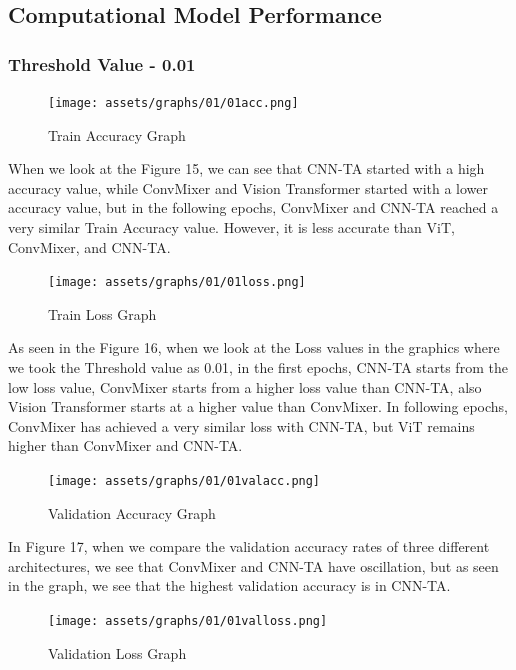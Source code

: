 \documentclass[]{article}
\begin{document}
\subsection{Computational Model Performance}
\subsubsection{Threshold Value - 0.01}
\begin{figure}[H]
    \begin{center}
        \texttt{[image: assets/graphs/01/01acc.png]}
        \caption{Train Accuracy Graph}
    \end{center}
\end{figure}
When we look at the Figure 15, we can see that CNN-TA started with a high accuracy value, while ConvMixer and Vision Transformer started with a lower accuracy value, but in the following epochs, ConvMixer and CNN-TA reached a very similar Train Accuracy value. However, it is less accurate than ViT, ConvMixer, and CNN-TA.
\begin{figure}[H]
    \begin{center}
        \texttt{[image: assets/graphs/01/01loss.png]}
        \caption{Train Loss Graph}
    \end{center}
\end{figure}
\noindent
As seen in the Figure 16, when we look at the Loss values in the graphics where we took the Threshold value as 0.01, in the first epochs, CNN-TA starts from the low loss value, ConvMixer starts from a higher loss value than CNN-TA, also Vision Transformer starts at a higher value than ConvMixer. In following epochs, ConvMixer has achieved a very similar loss with CNN-TA, but ViT remains higher than ConvMixer and CNN-TA. \vspace{0.1cm}
\begin{figure}[H]
    \begin{center}
        \texttt{[image: assets/graphs/01/01valacc.png]}
        \caption{Validation Accuracy Graph}
    \end{center}
\end{figure}
\noindent
In Figure 17, when we compare the validation accuracy rates of three different architectures, we see that ConvMixer and CNN-TA have oscillation, but as seen in the graph, we see that the highest validation accuracy is in CNN-TA.
\begin{figure}[H]
    \begin{center}
        \texttt{[image: assets/graphs/01/01valloss.png]}
        \caption{Validation Loss Graph}
    \end{center}
\end{figure}
\end{document}
